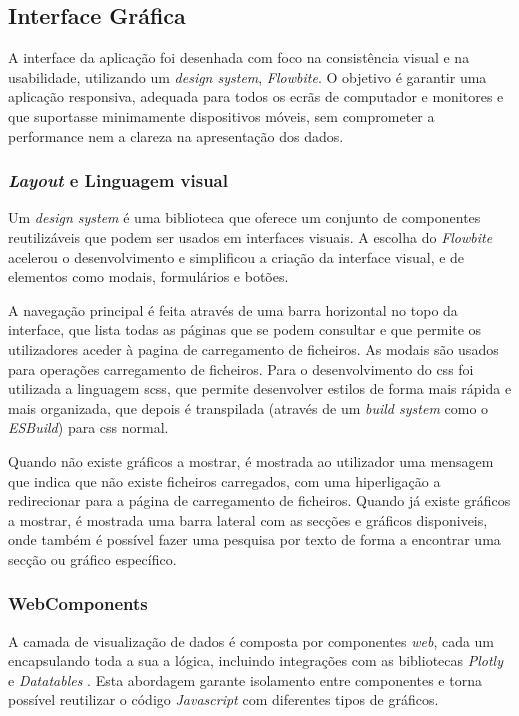 \subsection{Interface Gráfica}

A interface da aplicação foi desenhada com foco na consistência visual e na usabilidade, utilizando um \textit{design system}, \textit{Flowbite}. O objetivo é garantir uma aplicação responsiva, adequada para todos os ecrãs de computador e monitores e que suportasse minimamente dispositivos móveis, sem comprometer a performance nem a clareza na apresentação dos dados.

\subsubsection{\textit{Layout} e Linguagem visual}

Um \textit{design system} é uma biblioteca que oferece um conjunto de componentes reutilizáveis que podem ser usados em interfaces visuais. A escolha do \textit{Flowbite} acelerou o desenvolvimento e simplificou a criação da interface visual, e de elementos como modais, formulários e botões. 

A navegação principal é feita através de uma barra horizontal no topo da interface, que lista todas as páginas que se podem consultar e que permite os utilizadores aceder à pagina de carregamento de ficheiros. As modais são usados para operações carregamento de ficheiros. Para o desenvolvimento do \gls{css} foi utilizada a linguagem \gls{scss}, que permite desenvolver estilos de forma mais rápida e mais organizada, que depois é transpilada (através de um \textit{build system} como o \textit{ESBuild}\cite{esbuild}) para \gls{css} normal.

Quando não existe gráficos a mostrar, é mostrada ao utilizador uma mensagem que indica que não existe ficheiros carregados, com uma hiperligação a redirecionar para a página de carregamento de ficheiros. Quando já existe gráficos a mostrar, é mostrada uma barra lateral com as secções e gráficos disponiveis, onde também é possível fazer uma pesquisa por texto de forma a encontrar uma secção ou gráfico específico.

\subsubsection{WebComponents}

A camada de visualização de dados é composta por componentes \textit{web}, cada um encapsulando toda a sua a lógica, incluindo integrações com as bibliotecas \textit{Plotly} e \textit{Datatables} . Esta abordagem garante isolamento entre componentes e torna possível reutilizar o código \textit{Javascript} com diferentes tipos de gráficos. 

